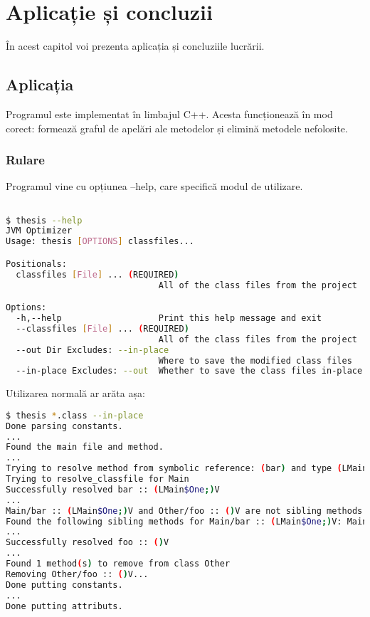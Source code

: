 \chapter{Aplicație și concluzii}

În acest capitol voi prezenta aplicația și concluziile lucrării.

\section{Aplicația}

Programul este implementat în limbajul C++.
Acesta funcționează în mod corect: formează graful de
apelări ale metodelor și elimină metodele nefolosite.

\subsection{Rulare}

Programul vine cu opțiunea --help, care specifică modul de utilizare.
\begin{lstlisting}[language=Bash]

$ thesis --help
JVM Optimizer
Usage: thesis [OPTIONS] classfiles...

Positionals:
  classfiles [File] ... (REQUIRED)
                              All of the class files from the project

Options:
  -h,--help                   Print this help message and exit
  --classfiles [File] ... (REQUIRED)
                              All of the class files from the project
  --out Dir Excludes: --in-place
                              Where to save the modified class files
  --in-place Excludes: --out  Whether to save the class files in-place

\end{lstlisting}

Utilizarea normală ar arăta așa:

\begin{lstlisting}[language=Bash]
$ thesis *.class --in-place
Done parsing constants.
...
Found the main file and method.
...
Trying to resolve method from symbolic reference: (bar) and type (LMain$One;)V.
Trying to resolve_classfile for Main
Successfully resolved bar :: (LMain$One;)V
...
Main/bar :: (LMain$One;)V and Other/foo :: ()V are not sibling methods
Found the following sibling methods for Main/bar :: (LMain$One;)V: Main/bar :: (LMain$One;)V;
...
Successfully resolved foo :: ()V
...
Found 1 method(s) to remove from class Other
Removing Other/foo :: ()V...
Done putting constants.
...
Done putting attributs.
\end{lstlisting}

